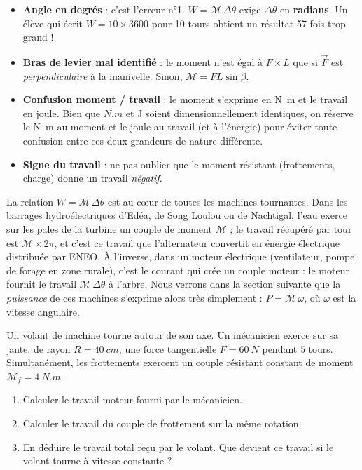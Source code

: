 \documentclass[11pt]{article}
\begin{document}
\begin{attention}
\begin{itemize}
\item \textbf{Angle en degrés} : c'est l'erreur n°1. $W = \mathcal{M}\,\Delta\theta$ exige $\Delta\theta$ en \textbf{radians}. Un élève qui écrit $W = 10 \times 3600$ pour 10 tours obtient un résultat 57 fois trop grand !
\item \textbf{Bras de levier mal identifié} : le moment n'est égal à $F \times L$ que si $\vec{F}$ est \emph{perpendiculaire} à la manivelle. Sinon, $\mathcal{M} = F L \sin\beta$.
\item \textbf{Confusion moment / travail} : le moment s'exprime en \si{N.m} et le travail en joule. Bien que $\si{N.m}$ et \si{J} soient dimensionnellement identiques, on réserve le \si{N.m} au moment et le joule au travail (et à l'énergie) pour éviter toute confusion entre ces deux grandeurs de nature différente.
\item \textbf{Signe du travail} : ne pas oublier que le moment résistant (frottements, charge) donne un travail \emph{négatif}.
\end{itemize}
\end{attention}

\begin{savaistu}
La relation $W = \mathcal{M}\,\Delta\theta$ est au cœur de toutes les machines tournantes. Dans les barrages hydroélectriques d'Edéa, de Song Loulou ou de Nachtigal, l'eau exerce sur les pales de la turbine un couple de moment $\mathcal{M}$ ; le travail récupéré par tour est $\mathcal{M} \times 2\pi$, et c'est ce travail que l'alternateur convertit en énergie électrique distribuée par ENEO. À l'inverse, dans un moteur électrique (ventilateur, pompe de forage en zone rurale), c'est le courant qui crée un couple moteur : le moteur fournit le travail $\mathcal{M}\,\Delta\theta$ à l'arbre. Nous verrons dans la section suivante que la \emph{puissance} de ces machines s'exprime alors très simplement : $P = \mathcal{M}\,\omega$, où $\omega$ est la vitesse angulaire.
\end{savaistu}

\begin{exercice}
Un volant de machine tourne autour de son axe. Un mécanicien exerce sur sa jante, de rayon $R = \SI{40}{cm}$, une force tangentielle $F = \SI{60}{N}$ pendant $5$ tours. Simultanément, les frottements exercent un couple résistant constant de moment $\mathcal{M}_f = \SI{4}{N.m}$.
\begin{enumerate}
\item Calculer le travail moteur fourni par le mécanicien.
\item Calculer le travail du couple de frottement sur la même rotation.
\item En déduire le travail total reçu par le volant. Que devient ce travail si le volant tourne à vitesse constante ?
\end{enumerate}
\end{exercice}
\end{document}
